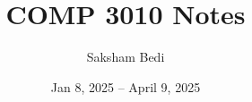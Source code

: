 \documentclass{article}
\begin{document}
\title{COMP 3010 Notes}
\date{Jan 8, 2025 -- April 9, 2025}
\author{Saksham Bedi}


\maketitle
\pagebreak
\tableofcontents
\bigskip















\end{document}
